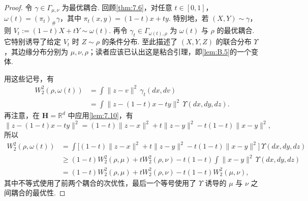 \begin{proof}
令 $\gamma\in\Gamma_{\mu,\nu}$ 为最优耦合. 回顾\autoref{thm:7.6}，对任意 $t\in[0,1]$，$\omega(t)=(\pi_t)_\#\gamma$，其中 $\pi_t(x,y)=(1-t)x+ty$. 特别地，若 $(X,Y)\sim\gamma$，则 $V_t:=(1-t)X+tY\sim\omega(t)$. 再令 $\gamma_t\in\Gamma_{\omega(t),\rho}$ 为 $\omega(t)$ 与 $\rho$ 的最优耦合. 它特别诱导了给定 $V_t$ 时 $Z\sim\rho$ 的条件分布. 至此描述了 $(X,Y,Z)$ 的联合分布 $\Upsilon$，其边缘分布分别为 $\mu,\nu,\rho$；读者应该已认出这是粘合引理，即\autoref{lem:B.5}的一个变体.

用这些记号，有
$$\begin{aligned}
W_2^2(\rho,\omega(t))&=\int\lVert z-v\rVert^2\,\gamma_t(dx,dv)\\
&=\int\lVert z-(1-t)x-ty\rVert^2\,\Upsilon(dx,dy,dz).
\end{aligned}$$
再注意，在 $\mathbf H=\mathbb R^d$ 中应用\autoref{lem:7.10}，有
$$\lVert z-(1-t)x-ty\rVert^2
=(1-t)\lVert z-x\rVert^2+t\lVert z-y\rVert^2-t(1-t)\lVert x-y\rVert^2,$$
所以
$$\begin{aligned}
W_2^2(\rho,\omega(t))
&=\int\bigl[(1-t)\lVert z-x\rVert^2+t\lVert z-y\rVert^2
-t(1-t)\lVert x-y\rVert^2\bigr]\,\Upsilon(dx,dy,dz)\\
&\ge(1-t)W_2^2(\rho,\mu)+tW_2^2(\rho,\nu)
-t(1-t)\int\lVert x-y\rVert^2\,\Upsilon(dx,dy,dz)\\
&=(1-t)W_2^2(\rho,\mu)+tW_2^2(\rho,\nu)-t(1-t)W_2^2(\mu,\nu),
\end{aligned}$$
其中不等式使用了前两个耦合的次优性，最后一个等号使用了 $\Upsilon$ 诱导的 $\mu$ 与 $\nu$ 之间耦合的最优性.
\end{proof}
